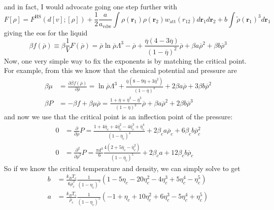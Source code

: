 \documentclass[aps,preprint]{revtex4-1}%
\begin{document}
and in fact, I would advocate going one step further with
\begin{equation}
F\left[  \rho\right]  =F^{\text{HS}}\left(  d\left[  v\right]  ;\left[
\rho\right]  \right)  +\frac{1}{2}\frac{a}{a_{\text{vdw}}}\int\rho\left(
\mathbf{r}_{1}\right)  \rho\left(  \mathbf{r}_{2}\right)  w_{\text{att}%
}\left(  r_{12}\right)  d\mathbf{r}_{1}d\mathbf{r}_{2}+b\int\widetilde{\rho
}\left(  \mathbf{r}_{1}\right)  ^{3}d\mathbf{r}_{1}%
\end{equation}
giving the eos for the liquid%
\begin{equation}
\beta f\left(  \overline{\rho}\right)  \equiv\beta\frac{1}{V}F\left(
\overline{\rho}\right)  =\overline{\rho}\ln\overline{\rho}\Lambda
^{3}-\overline{\rho}+\frac{\overline{\eta}\left(  4-3\overline{\eta}\right)
}{\left(  1-\overline{\eta}\right)  ^{2}}\overline{\rho}+\beta a\overline
{\rho}^{2}+\beta b\overline{\rho}^{3}%
\end{equation}
Now, one very simple way to fix the exponents is by matching the critical
point. For example, from this we know that the chemical potential and pressure
are%
\begin{align*}
\beta\mu & =\frac{\partial\beta f\left(  \overline{\rho}\right)  }%
{\partial\overline{\rho}}=\ln\overline{\rho}\Lambda^{3}+\frac{\overline{\eta
}\left(  8-9\overline{\eta}+3\overline{\eta}^{2}\right)  }{\left(
1-\overline{\eta}\right)  ^{3}}+2\beta a\overline{\rho}+3\beta b\overline
{\rho}^{2}\\
\beta P  & =-\beta f+\beta\mu\overline{\rho}=\frac{1+\overline{\eta}%
+\overline{\eta}^{2}-\overline{\eta}^{3}}{\left(  1-\overline{\eta}\right)
^{3}}\overline{\rho}+\beta a\overline{\rho}^{2}+2\beta b\overline{\rho}^{3}%
\end{align*}
and now we use that the critical point is an inflection point of the pressure:%
\begin{align}
0  & =\frac{\partial}{\partial\overline{\rho}}P=\frac{1+4\overline{\eta}%
_{c}+4\overline{\eta}_{c}^{2}-4\overline{\eta}_{c}^{3}+\overline{\eta}_{c}%
^{4}}{\left(  1-\overline{\eta}_{c}\right)  ^{4}}+2\beta_{c}a\overline{\rho
}_{c}+6\beta_{c}b\overline{\rho}_{c}^{2}\nonumber\\
0  & =\frac{\partial^{2}}{\partial\overline{\rho}^{2}}P=\frac{\pi d^{3}}%
{6}\frac{4\left(  2+5\overline{\eta}_{c}-\overline{\eta}_{c}^{2}\right)
}{\left(  1-\overline{\eta}_{c}\right)  ^{5}}+2\beta_{c}a+12\beta
_{c}b\overline{\rho}_{c}%
\end{align}
So if we know the critical temperature and density, we can simply solve to get%
\begin{align*}
b  & =\frac{k_{B}T_{c}}{6\overline{\rho}_{c}^{2}}\frac{1}{\left(  1-\eta
_{c}\right)  ^{5}}\left(  1-5\eta_{c}-20\eta_{c}^{2}-4\eta_{c}^{3}+5\eta
_{c}^{4}-\eta_{c}^{5}\right)  \allowbreak\\
a  & =\frac{k_{B}T_{c}}{\overline{\rho}_{c}}\frac{1}{\left(  1-\eta
_{c}\right)  ^{5}}\left(  -1+\eta_{c}+10\eta_{c}^{2}+6\eta_{c}^{3}-5\eta
_{c}^{4}+\eta_{c}^{5}\right)  \allowbreak
\end{align*}
\end{document}
